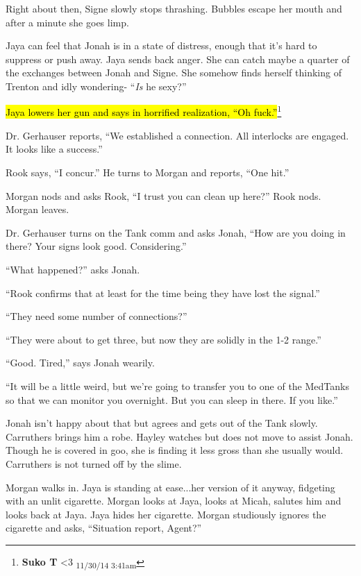 Right about then, Signe slowly stops thrashing.  Bubbles escape her mouth and after a minute she goes limp.



Jaya can feel that Jonah is in a state of distress, enough that it's hard to suppress or push away.  Jaya sends back anger.  She can catch maybe a quarter of the exchanges between Jonah and Signe.  She somehow finds herself thinking of Trenton and idly wondering- ``\textit{Is} he sexy?''



\hl{Jaya lowers her gun and says in horrified realization, ``Oh fuck.''}\footnote{\textbf{Suko T }\textless 3 \textsubscript{11/30/14 3:41am}}





Dr. Gerhauser reports, ``We established a connection.  All interlocks are engaged.  It looks like a success.''

Rook says, ``I concur.''  He turns to Morgan and reports, ``One hit.''

Morgan nods and asks Rook, ``I trust you can clean up here?''  Rook nods.  Morgan leaves.



Dr. Gerhauser turns on the Tank comm and asks Jonah, ``How are you doing in there?  Your signs look good.  Considering.''

``What happened?'' asks Jonah. 

``Rook confirms that at least for the time being they have lost the signal.''

``They need some number of connections?''

``They were about to get three, but now they are solidly in the 1-2 range.''

``Good.  Tired,'' says Jonah wearily.

``It will be a little weird, but we're going to transfer you to one of the MedTanks so that we can monitor you overnight.  But you can sleep in there.  If you like.''

Jonah isn't happy about that but agrees and gets out of the Tank slowly.  Carruthers brings him a robe.  Hayley watches but does not move to assist Jonah.  Though he is covered in goo, she is finding it less gross than she usually would.  Carruthers is not turned off by the slime.





Morgan walks in.  Jaya is standing at ease...her version of it anyway, fidgeting with an unlit cigarette.  Morgan looks at Jaya, looks at Micah, salutes him and looks back at Jaya.  Jaya hides her cigarette.  Morgan studiously ignores the cigarette and asks, ``Situation report, Agent?''

